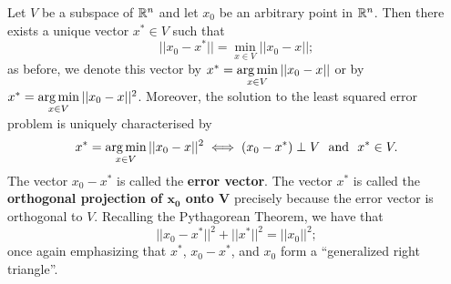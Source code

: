 


\begin{tcolorbox}[sharp corners, colback=green!30, colframe=green!80!blue, title=\textbf{\large Projection Theorem: The Super Tool that Solves all Least Squares Problems}]

Let $V$ be a subspace of $\mathbb R^n$ and let $x_0$ be an arbitrary point in $\mathbb R^n$. Then there exists a unique vector $x^\ast \in V$ such that 
$$ ||x_0-x^\ast||=\min\limits_{x \in V} ||x_0-x||;$$
as before, we denote this vector by $x^\ast = \operatorname*{arg\,min}\limits_{x \in V} || x_0 - x||$ or by $x^\ast = \operatorname*{arg\,min}\limits_{x \in V} || x_0 - x||^2$. Moreover, the solution to the least squared error problem is uniquely characterised by
\begin{equation}
    \label{eq:ProjThmCharacterization}
    x^\ast = \operatorname*{arg\,min}\limits_{x \in V} || x_0 - x||^2 \iff \left(x_0-x^\ast\right) \perp V ~~\text{and}~~x^\ast \in V.
\end{equation}
 The vector $x_0 - x^\ast$ is called the \textbf{error vector}. The vector $x^\ast$ is called the \textbf{orthogonal projection of $\mathbf{x_0}$ onto $\mathbf{V}$} precisely because the error vector is orthogonal to $V$. Recalling the Pythagorean Theorem, we have that 
 $$||x_0 - x^\ast||^2 + || x^\ast||^2 = ||x_0||^2; $$
 once again emphasizing that $x^\ast$, $x_0 - x^\ast$, and $x_0$ form a ``generalized right triangle''.
\end{tcolorbox}

\vspace*{0.2cm}

